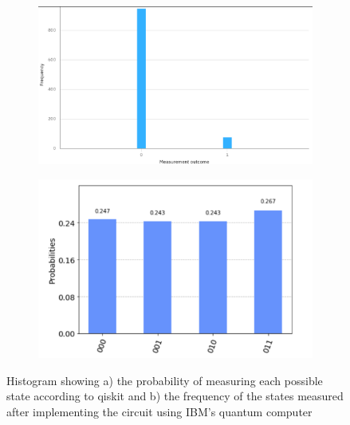 \begin{figure}[H]
    \centering
    \begin{subfigure}[h]{0.49\textwidth}
        \centering
        \includegraphics[width=\textwidth]{lab3/images/ibmTeleport.png}
        \caption{}
        \label{fig:ibmHistogramTele}
    \end{subfigure}
    \hfill
    \begin{subfigure}[h]{0.49\textwidth}
        \centering
        \includegraphics[width=\textwidth]{lab3/images/qiskitHist.png}
        \caption{}
        \label{fig:qiskitHistogramTele}
    \end{subfigure}
    \captionsetup{font = it, labelfont = bf, width=.91\linewidth, justification=centering}
    \caption{Histogram showing a) the probability of measuring each possible state according to qiskit and b) the frequency of the states measured after implementing the circuit using IBM's quantum computer} 
    \label{fig:teleHist}
\end{figure}

